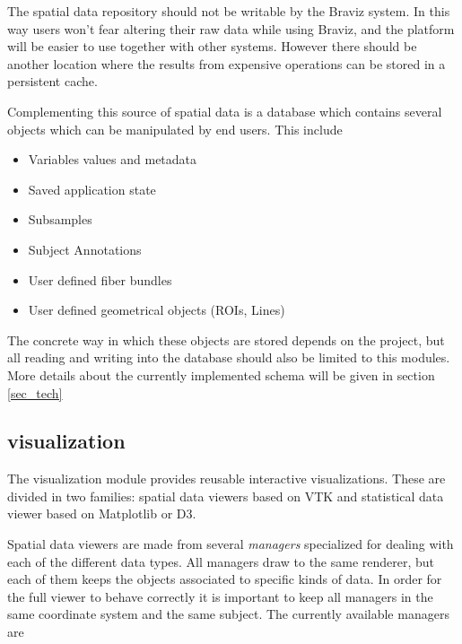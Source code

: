 The spatial data repository should not be writable by the Braviz system. In this way users won't fear altering their raw data while using Braviz, and the platform will be easier to use together with other systems. However there should be another location where the results from expensive operations can be stored in a persistent cache. 

Complementing this source of spatial data is a database which contains several objects which can be manipulated by end users. This include

\begin{itemize}
\item Variables values and metadata
\item Saved application state
\item Subsamples
\item Subject Annotations
\item User defined fiber bundles
\item User defined geometrical objects (ROIs, Lines)
\end{itemize}

The concrete way in which these objects are stored depends on the project, but all reading and writing into the database should also be limited to this modules. More details about the currently implemented schema will be given in section \ref{sec_tech}


\subsection{visualization}

The visualization module provides reusable interactive visualizations. These are divided in two families: spatial data viewers based on VTK and statistical data viewer based on Matplotlib or D3. 

Spatial data viewers are made from several \emph{managers} specialized for dealing with each of the different data types. All managers draw to the same renderer, but each of them keeps the objects associated to specific kinds of data. In order for the full viewer to behave correctly it is important to keep all managers in the same coordinate system and the same subject. The currently available managers are 

